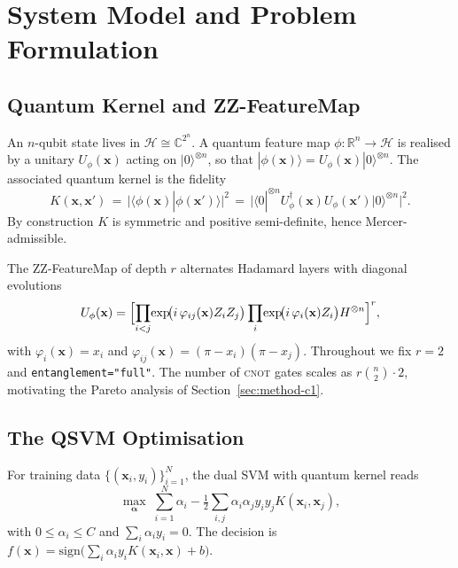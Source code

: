 \documentclass[journal]{IEEEtran}
\newcommand{\ZZ}{\textsc{ZZ}}
\begin{document}
  \section{System Model and Problem Formulation}\label{sec:model}

  \subsection{Quantum Kernel and \ZZ{}-FeatureMap}
  An $n$-qubit state lives in $\mathcal{H}\cong\mathbb{C}^{2^n}$. A
  quantum feature map $\phi:\mathbb{R}^{n}\!\to\!\mathcal{H}$ is
  realised by a unitary $U_{\phi}(\mathbf{x})$ acting on $|0\rangle^{
  \otimes n}$, so that $|\phi(\mathbf{x})\rangle =
  U_{\phi}(\mathbf{x})|0\rangle^{\otimes n}$. The associated quantum
  kernel is the fidelity
  \begin{equation}
  K(\mathbf{x},\mathbf{x}')
  \,=\,\bigl|\langle\phi(\mathbf{x})|\phi(\mathbf{x}')\rangle\bigr|^{2}
  \,=\,\bigl|\langle 0|^{\otimes n}U_{\phi}^{\dagger}(\mathbf{x})
  U_{\phi}(\mathbf{x}')|0\rangle^{\otimes n}\bigr|^{2}.
  \label{eq:qkernel}
  \end{equation}
  By construction $K$ is symmetric and positive semi-definite, hence
  Mercer-admissible.

  The \ZZ{}-FeatureMap of depth $r$ alternates Hadamard layers with
  diagonal evolutions
  \begin{equation}
  U_{\phi}(\mathbf{x})=\Bigl[
    \prod_{i<j}\!\exp\!\bigl(i\,\varphi_{ij}(\mathbf{x})Z_iZ_j\bigr)
    \prod_{i}\!\exp\!\bigl(i\,\varphi_i(\mathbf{x})Z_i\bigr)
    H^{\otimes n}\Bigr]^{r},
  \end{equation}
  with $\varphi_i(\mathbf{x})=x_i$ and
  $\varphi_{ij}(\mathbf{x})=(\pi-x_i)(\pi-x_j)$. Throughout we fix
  $r{=}2$ and \texttt{entanglement="full"}. The number of \textsc{cnot}
  gates scales as $r\binom{n}{2}\!\cdot\!2$, motivating the Pareto
  analysis of Section~\ref{sec:method-c1}.

  \subsection{The QSVM Optimisation}
  For training data $\{(\mathbf{x}_i,y_i)\}_{i=1}^{N}$, the dual SVM
  with quantum kernel reads
  \begin{equation}
  \max_{\boldsymbol\alpha}\;
    \sum_{i=1}^{N}\alpha_i-\tfrac{1}{2}\sum_{i,j}\alpha_i\alpha_j
    y_iy_j K(\mathbf{x}_i,\mathbf{x}_j),
  \end{equation}
  with $0\le\alpha_i\le C$ and $\sum_i\alpha_iy_i=0$. The decision is
  $f(\mathbf{x})=\mathrm{sign}\bigl(\sum_i\alpha_iy_iK(\mathbf{x}_i,
  \mathbf{x})+b\bigr)$.
\end{document}
